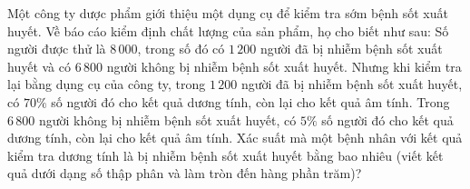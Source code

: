 \begin{bt}%
	Một công ty dược phẩm giới thiệu một dụng cụ để kiểm tra sớm bệnh sốt xuất huyết. Về báo cáo kiểm định chất lượng của sản phẩm, họ cho biết như sau: Số người được thử là $8\,000$, trong số đó có $1\,200$ người đã bị nhiễm bệnh sốt xuất huyết và có $6\,800$ người không bị nhiễm bệnh sốt xuất huyết. Nhưng khi kiểm tra lại bằng dụng cụ của công ty, trong $1\,200$ người đã bị nhiễm bệnh sốt xuất huyết, có $70 \%$ số người đó cho kết quả dương tính, còn lại cho kết quả âm tính. Trong $6\,800$ người không bị nhiễm bệnh sốt xuất huyết, có $5 \%$ số người đó cho kết quả dương tính, còn lại cho kết quả âm tính. Xác suất mà một bệnh nhân với kết quả kiểm tra dương tính là bị nhiễm bệnh sốt xuất huyết bằng bao nhiêu (viết kết quả dưới dạng số thập phân và làm tròn đến hàng phần trăm)?\par
\end{bt}

